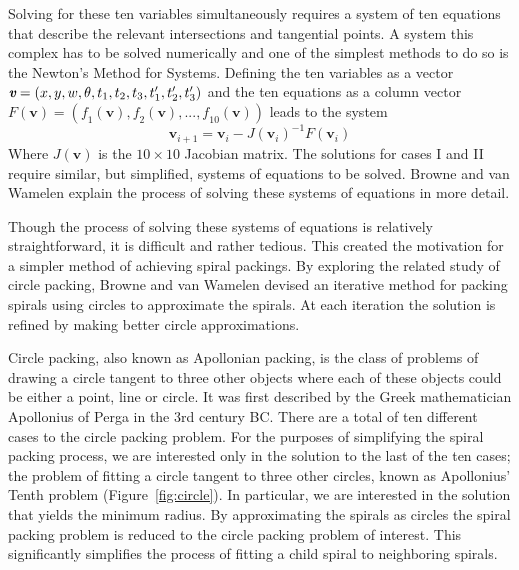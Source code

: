 \documentclass[11pt]{IEEEtran}
\begin{document}
Solving for these ten variables simultaneously requires a system of ten equations that describe the relevant intersections and tangential points. A system this complex has to be solved numerically and one of the simplest methods to do so is the Newton's Method for Systems. Defining the ten variables as a vector $\textit{\textbf{v}} = (x, y, w, \theta, t_{1}, t_{2}, t_{3}, t^{\prime}_{1}, t^{\prime}_{2}, t^{\prime}_{3})$ and the ten equations as a column vector $\textit{F}(\textbf{v}) = (\textit{f}_{1}(\textbf{v}), \textit{f}_{2}(\textbf{v}),...,\textit{f}_{10}(\textbf{v}))$ leads to the system 
\begin{equation} 
	\label{eq:6}
	\boldsymbol{v}_{i+1} = \boldsymbol{v}_{i} - J(\boldsymbol{v}_{i})^{-1}F(\boldsymbol{v}_{i})
\end{equation}
Where $\textit{J}(\textbf{v})$ is the $10\times10$ Jacobian matrix. The solutions for cases I and II require similar, but simplified, systems of equations to be solved. Browne and van Wamelen explain the process of solving these systems of equations in more detail\cite{Browne2006834}. 

Though the process of solving these systems of equations is relatively straightforward, it is difficult and rather tedious. This created the motivation for a simpler method of achieving spiral packings. By exploring the related study of circle packing, Browne and van Wamelen devised an iterative method for packing spirals using circles to approximate the spirals. At each iteration the solution is refined by making better circle approximations.\cite{Browne2006834}

Circle packing, also known as Apollonian packing, is the class of problems of drawing a circle tangent to three other objects where each of these objects could be either a point, line or circle. It was first described by the Greek mathematician Apollonius of Perga in the 3rd century BC. There are a total of ten different cases to the circle packing problem.\cite{Bourke2006} For the purposes of simplifying the spiral packing process, we are interested only in the solution to the last of the ten cases; the problem of fitting a circle tangent to three other circles, known as Apollonius' Tenth problem (Figure~\ref{fig:circle}). In particular, we are interested in the solution that yields the minimum radius.\cite{Browne2006834} By approximating the spirals as circles the spiral packing problem is reduced to the circle packing problem of interest. This significantly simplifies the process of fitting a child spiral to neighboring spirals.
\end{document}
